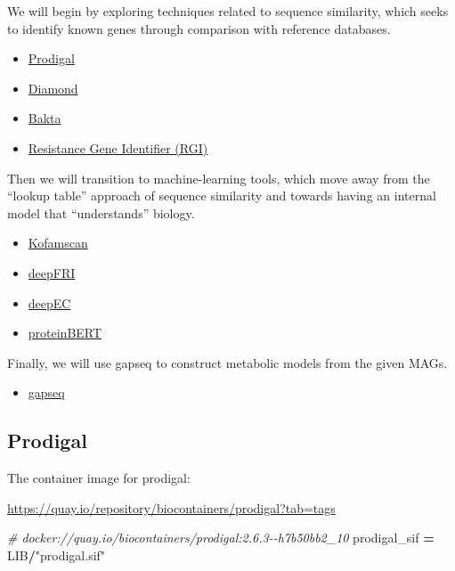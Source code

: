 \documentclass[
]{book}
\newenvironment{Shaded}{\begin{snugshade}}{\end{snugshade}}
\newcommand{\CommentTok}[1]{\textcolor[rgb]{0.56,0.35,0.01}{\textit{#1}}}
\newcommand{\NormalTok}[1]{#1}
\newcommand{\OperatorTok}[1]{\textcolor[rgb]{0.81,0.36,0.00}{\textbf{#1}}}
\newcommand{\StringTok}[1]{\textcolor[rgb]{0.31,0.60,0.02}{#1}}
\providecommand{\tightlist}{%
  \setlength{\itemsep}{0pt}\setlength{\parskip}{0pt}}
\begin{document}
We will begin by exploring techniques related to sequence similarity, which seeks to identify known genes through comparison with reference databases.

\begin{itemize}
\tightlist
\item
  \hyperref[prodigal]{Prodigal}
\item
  \hyperref[diamond]{Diamond}
\item
  \hyperref[bakta]{Bakta}
\item
  \hyperref[resistance-gene-identifier-rgi]{Resistance Gene Identifier (RGI)}
\end{itemize}

Then we will transition to machine-learning tools, which move away from the ``lookup table'' approach of sequence similarity and towards
having an internal model that ``understands'' biology.

\begin{itemize}
\tightlist
\item
  \hyperref[kofamscan]{Kofamscan}
\item
  \hyperref[deepfri]{deepFRI}
\item
  \hyperref[deepec]{deepEC}
\item
  \hyperref[proteinbert]{proteinBERT}
\end{itemize}

Finally, we will use gapseq to construct metabolic models from the given MAGs.

\begin{itemize}
\tightlist
\item
  \hyperref[gapseq]{gapseq}
\end{itemize}

\subsection{Prodigal}\label{prodigal}

The container image for prodigal:

\url{https://quay.io/repository/biocontainers/prodigal?tab=tags}

\begin{Shaded}
\begin{Highlighting}[numbers=left,,]
\CommentTok{\# docker://quay.io/biocontainers/prodigal:2.6.3{-}{-}h7b50bb2\_10}
\NormalTok{prodigal\_sif }\OperatorTok{=}\NormalTok{ LIB}\OperatorTok{/}\StringTok{"prodigal.sif"}
\end{Highlighting}
\end{Shaded}
\end{document}
